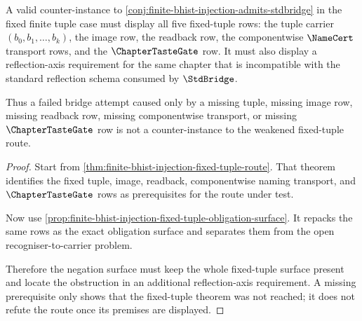 \begin{theorem}
\label{thm:finite-tuple-stdbridge-refutation-candidate}
A valid counter-instance to \autoref{conj:finite-bhist-injection-admits-stdbridge} in the fixed finite tuple case must display all five fixed-tuple rows: the tuple carrier $(b_0,b_1,\ldots,b_k)$, the image row, the readback row, the componentwise $\NameCert$ transport rows, and the $\ChapterTasteGate$ row. It must also display a reflection-axis requirement for the same chapter that is incompatible with the standard reflection schema consumed by $\StdBridge$.

Thus a failed bridge attempt caused only by a missing tuple, missing image row, missing readback row, missing componentwise transport, or missing $\ChapterTasteGate$ row is not a counter-instance to the weakened fixed-tuple route.
\end{theorem}
\begin{proof}
Start from \autoref{thm:finite-bhist-injection-fixed-tuple-route}. That theorem identifies the fixed tuple, image, readback, componentwise naming transport, and $\ChapterTasteGate$ rows as prerequisites for the route under test.

Now use \autoref{prop:finite-bhist-injection-fixed-tuple-obligation-surface}. It repacks the same rows as the exact obligation surface and separates them from the open recogniser-to-carrier problem.

Therefore the negation surface must keep the whole fixed-tuple surface present and locate the obstruction in an additional reflection-axis requirement. A missing prerequisite only shows that the fixed-tuple theorem was not reached; it does not refute the route once its premises are displayed.
\end{proof}

